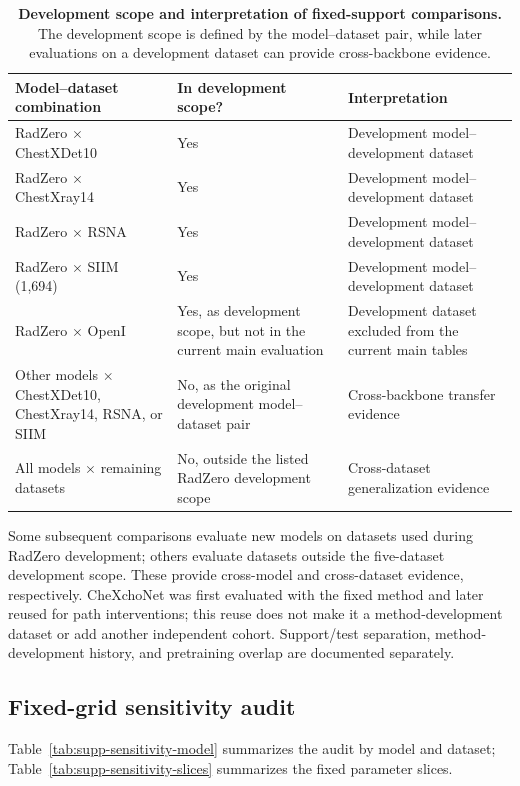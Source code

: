 \begin{table}[t]
\centering
\caption{\textbf{Development scope and interpretation of fixed-support comparisons.} The development scope is defined by the model--dataset pair, while later evaluations on a development dataset can provide cross-backbone evidence.}
\label{tab:supp-development-scope}
\footnotesize
\setlength{\tabcolsep}{4pt}
\renewcommand{\arraystretch}{1.12}
\begin{tabular*}{\textwidth}{@{\extracolsep{\fill}}p{}p{}p{}@{}}
\toprule
Model--dataset combination & In development scope? & Interpretation \\
\midrule
RadZero $\times$ ChestXDet10 & Yes & Development model--development dataset \\
RadZero $\times$ ChestXray14 & Yes & Development model--development dataset \\
RadZero $\times$ RSNA & Yes & Development model--development dataset \\
RadZero $\times$ SIIM (1,694) & Yes & Development model--development dataset \\
RadZero $\times$ OpenI & Yes, as development scope, but not in the current main evaluation & Development dataset excluded from the current main tables \\
Other models $\times$ ChestXDet10, ChestXray14, RSNA, or SIIM & No, as the original development model--dataset pair & Cross-backbone transfer evidence \\
All models $\times$ remaining datasets & No, outside the listed RadZero development scope & Cross-dataset generalization evidence \\
\bottomrule
\end{tabular*}
\end{table}

Some subsequent comparisons evaluate new models on datasets used during RadZero development; others evaluate datasets outside the five-dataset development scope. These provide cross-model and cross-dataset evidence, respectively. CheXchoNet was first evaluated with the fixed method and later reused for path interventions; this reuse does not make it a method-development dataset or add another independent cohort. Support/test separation, method-development history, and pretraining overlap are documented separately.

\subsection{Fixed-grid sensitivity audit}
\label{supp:sensitivity}
Table~\ref{tab:supp-sensitivity-model} summarizes the audit by model and dataset; Table~\ref{tab:supp-sensitivity-slices} summarizes the fixed parameter slices.

